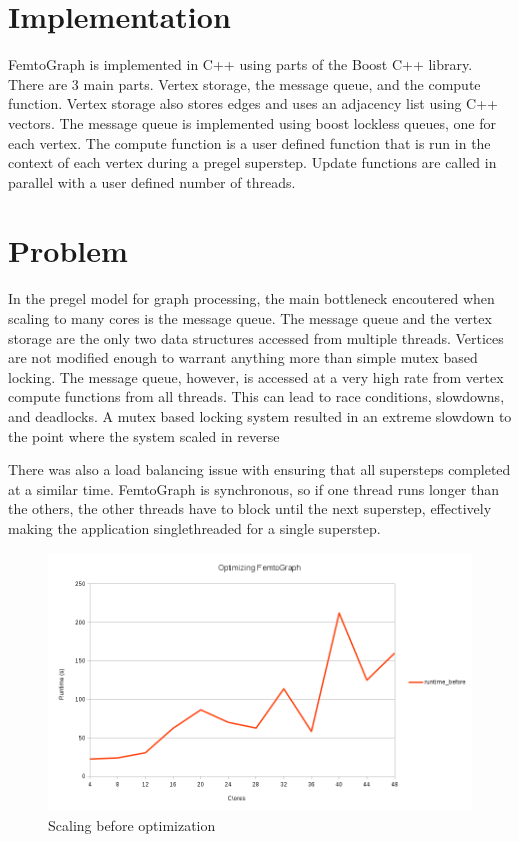 \documentclass{sig-alternate-05-2015}
\begin{document}
\section{Implementation}
\justify
FemtoGraph is implemented in C++ using parts of the Boost C++ library. There are 3 main parts. Vertex storage, the message queue, and the compute function. Vertex storage also stores edges and uses  an adjacency list using C++ vectors. The message queue is implemented using boost lockless queues, one for each vertex. The compute function is a user defined function that is run in the context of each vertex during a pregel superstep. Update functions are called in parallel with a user defined number of threads.

\section{Problem}
\justify
In the pregel model for graph processing, the main bottleneck encoutered when scaling to many cores is the message queue. The message queue and the vertex storage are the only two data structures accessed from multiple threads. Vertices are not modified enough to warrant anything more than simple mutex based locking. The message queue, however, is accessed at a very high rate from vertex compute functions from all threads. This can lead to race conditions, slowdowns, and deadlocks. A mutex based locking system resulted in an extreme slowdown to the point where the system scaled in reverse

There was also a load balancing issue with ensuring that all supersteps completed at a similar time. FemtoGraph is synchronous, so if one thread runs longer than the others, the other threads have to block until the next superstep, effectively making the application singlethreaded for a single superstep.  

\begin{figure}
  \centering
  \includegraphics[width=\columnwidth]{before.png}
  \caption{Scaling before optimization}
\end{figure}
\end{document}
